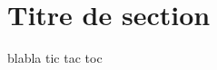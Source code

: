 \documentclass{book}
\begin{document}
    \lipsum[1-5]
    \section{Titre de section}
    blabla
    tic tac toc
\end{document}
